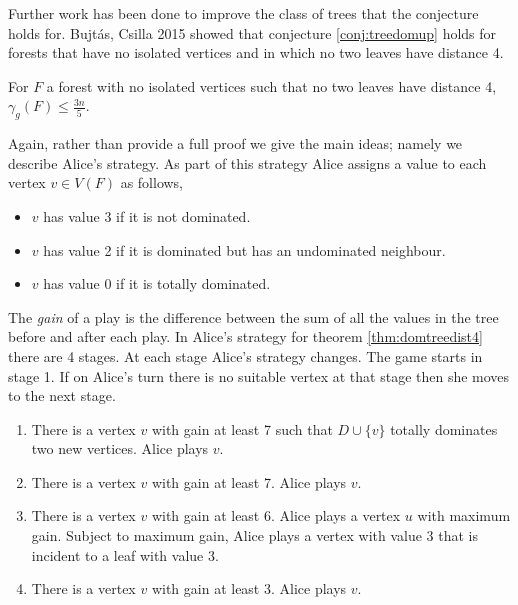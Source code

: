 %    
%    
Further work has been done to improve the class of trees that the conjecture holds for. Bujt\'{a}s, Csilla 2015 \cite{Bujt2015} showed that conjecture \ref{conj:treedomup} holds for forests that have no isolated vertices and in which no two leaves have distance 4.
%
\begin{theorem}\label{thm:domtreedist4}
    For $F$ a forest with no isolated vertices such that no two leaves have distance 4,
    $\gamma_g(F)\leq \frac{3n}{5}$.
\end{theorem}
Again, rather than provide a full proof we give the main ideas; namely we describe Alice's strategy. As part of this strategy Alice assigns a value to each vertex $v\in V(F)$ as follows, 
\begin{itemize}
    \item $v$ has value 3 if it is not dominated.
    \item $v$ has value 2 if it is dominated but has an undominated neighbour.
    \item $v$ has value 0 if it is totally dominated.
\end{itemize}
The \textit{gain} of a play is the difference between the sum of all the values in the tree before and after each play. In Alice's strategy for theorem \ref{thm:domtreedist4} there are 4 stages. At each stage Alice's strategy changes. The game starts in stage 1. If on Alice's turn there is no suitable vertex at that stage then she moves to the next stage. 
\begin{enumerate}[St{a}ge 1:]
    \item There is a vertex $v$ with gain at least 7 such that $D\cup\{v\}$ totally dominates two new vertices. Alice plays $v$.
    \item There is a vertex $v$ with gain at least 7. Alice plays $v$.
    \item There is a vertex $v$ with gain at least 6. Alice plays a vertex $u$ with maximum gain. Subject to maximum gain, Alice plays a vertex with value 3 that is incident to a leaf with value 3.
    \item There is a vertex $v$ with gain at least 3. Alice plays $v$.
\end{enumerate}
